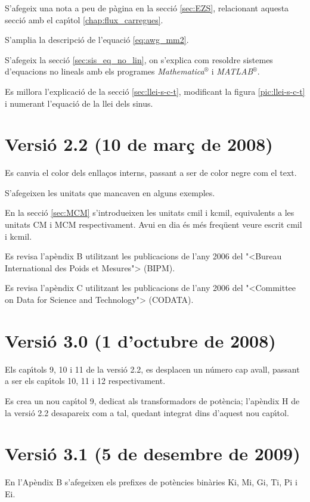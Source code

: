 S'afegeix una nota a peu de p\`{a}gina en la secci\'{o} \ref{sec:EZS}, relacionant aquesta secci\'{o} amb el cap\'{\i}tol \ref{chap:flux_carregues}.

S'amplia la descripci\'{o} de l'equaci\'{o} \eqref{eq:awg_mm2}.

S'afegeix la secci\'{o} \ref{sec:sis_eq_no_lin}, on s'explica com resoldre sistemes d'equacions no lineals amb els programes \textit{Mathematica}${}^\circledR$ i \textit{MATLAB}${}^\circledR$.

Es millora l'explicaci\'{o} de la secci\'{o} \ref{sec:llei-s-c-t}, modificant la figura \ref{pic:llei-s-c-t} i numerant l'equaci\'{o} de la llei dels sinus.

\section*{Versi\'{o} 2.2 (10 de mar\c{c} de 2008)}

Es canvia el color dels enlla\c{c}os interns, passant a ser de color negre com el text.

S'afegeixen les unitats que mancaven en alguns exemples.

En la secci\'{o} \ref{sec:MCM} s'introdueixen les unitats cmil i kcmil, equivalents a les unitats CM i MCM respectivament. Avui en dia \'{e}s m\'{e}s freq\"{u}ent veure escrit cmil i kcmil.

Es revisa l'ap\`{e}ndix B utilitzant les publicacions de l'any 2006 del {"<}Bureau
International des Poids et Mesures{">} (\textsf{BIPM}).

Es revisa l'ap\`{e}ndix C utilitzant les publicacions de l'any 2006 del {"<}Committee on Data for Science and Technology{">} (\textsf{CODATA}).

\section*{Versi\'{o} 3.0 (1 d'octubre de 2008)}

Els cap\'{\i}tols 9, 10 i 11 de la versi\'{o} 2.2, es desplacen un n\'{u}mero cap
avall, passant a ser els cap\'{\i}tols 10, 11 i 12 respectivament.

Es crea un nou cap\'{\i}tol 9, dedicat als transformadors de pot\`{e}ncia;
l'ap\`{e}ndix H de la versi\'{o} 2.2 desapareix com a tal, quedant integrat
dins d'aquest nou cap\'{\i}tol.


\section*{Versi\'{o} 3.1 (5 de desembre de 2009)}
En l'Ap\`{e}ndix B s'afegeixen els prefixes de pot\`{e}ncies bin\`{a}ries Ki, Mi, Gi, Ti, Pi i Ei.

